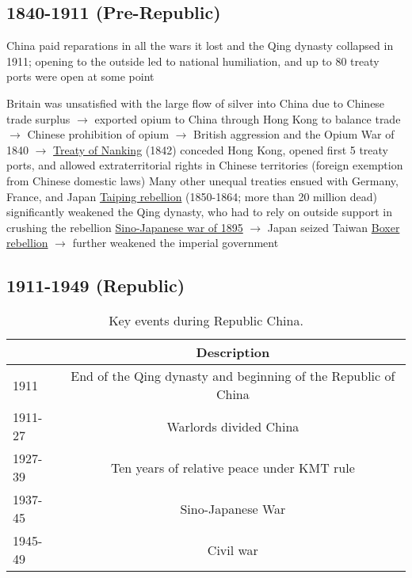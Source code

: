 \documentclass[11pt]{article}
\theoremstyle{definition}
\theoremstyle{remark}
\begin{document}
\subsection{1840-1911 (Pre-Republic)}
China paid reparations in all the wars it lost and the Qing dynasty collapsed in 1911; opening to the outside led to national humiliation, and up to 80 treaty ports were open at some point
\begin{outline}[enumerate]
\1 Britain was unsatisfied with the large flow of silver into China due to Chinese trade surplus $\to$ exported opium to China through Hong Kong to balance trade $\to$ Chinese prohibition of opium $\to$ British aggression and the Opium War of 1840 $\to$ \underline{Treaty of Nanking} (1842) conceded Hong Kong, opened first 5 treaty ports, and allowed extraterritorial rights in Chinese territories (foreign exemption from Chinese domestic laws)
	\2 Many other unequal treaties ensued with Germany, France, and Japan
\1 \underline{Taiping rebellion} (1850-1864; more than 20 million dead) significantly weakened the Qing dynasty, who had to rely on outside support in crushing the rebellion
\1 \underline{Sino-Japanese war of 1895} $\to$ Japan seized Taiwan
\1 \underline{Boxer rebellion} $\to$ further weakened the imperial government
\end{outline}

\subsection{1911-1949 (Republic)}
\begin{table}[ht]
\centering
\caption{Key events during Republic China.}
\begin{tabular}[t]{lc}
\toprule
&Description\\
\midrule
1911&End of the Qing dynasty and beginning of the Republic of China\\
1911-27&Warlords divided China\\
1927-39&Ten years of relative peace under KMT rule\\
1937-45&Sino-Japanese War\\
1945-49&Civil war\\
\bottomrule
\end{tabular}
\end{table}
\end{document}
